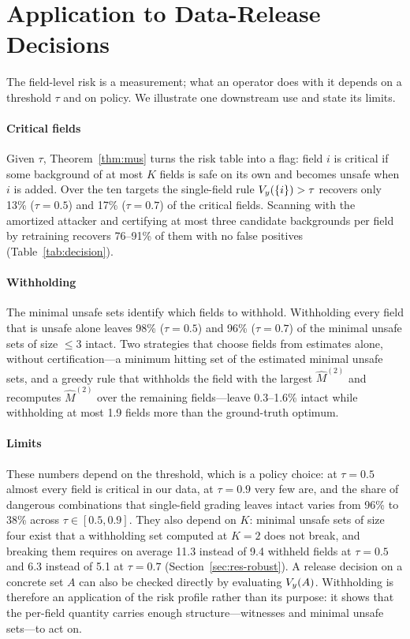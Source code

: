 \section{Application to Data-Release Decisions}\label{sec:application}

The field-level risk is a measurement; what an operator does with it depends on a threshold $\tau$
and on policy. We illustrate one downstream use and state its limits.

\paragraph{Critical fields}
Given $\tau$, Theorem~\ref{thm:mus} turns the risk table into a flag: field $i$ is critical if some
background of at most $K$ fields is safe on its own and becomes unsafe when $i$ is added. Over the ten
targets the single-field rule $V_y(\{i\})>\tau$ recovers only 13\% ($\tau=0.5$) and 17\% ($\tau=0.7$) of
the critical fields. Scanning with the amortized attacker and certifying at most three candidate
backgrounds per field by retraining recovers 76--91\% of them with no false positives
(Table~\ref{tab:decision}).

\paragraph{Withholding}
The minimal unsafe sets identify which fields to withhold. Withholding every field that is unsafe
alone leaves 98\% ($\tau=0.5$) and 96\% ($\tau=0.7$) of the minimal unsafe sets of size $\le3$ intact.
Two strategies that choose fields from estimates alone, without certification---a minimum hitting set of the estimated
minimal unsafe sets, and a greedy rule that withholds the field with the largest $\hat M^{(2)}$ and
recomputes $\hat M^{(2)}$ over the remaining fields---leave 0.3--1.6\% intact while withholding at most
1.9 fields more than the ground-truth optimum.

\paragraph{Limits}
These numbers depend on the threshold, which is a policy choice: at $\tau=0.5$ almost every field is
critical in our data, at $\tau=0.9$ very few are, and the share of dangerous combinations that
single-field grading leaves intact varies from 96\% to 38\% across $\tau\in[0.5,0.9]$. They also depend
on $K$: minimal unsafe sets of size four exist that a withholding set computed at $K=2$ does not break,
and breaking them requires on average 11.3 instead of 9.4 withheld fields at $\tau=0.5$ and 6.3 instead
of 5.1 at $\tau=0.7$ (Section~\ref{sec:res-robust}). A release decision on a concrete set $A$ can also be checked directly by
evaluating $V_y(A)$. Withholding is therefore an application of the risk profile rather than its purpose: it shows that
the per-field quantity carries enough structure---witnesses and minimal unsafe sets---to act on.


